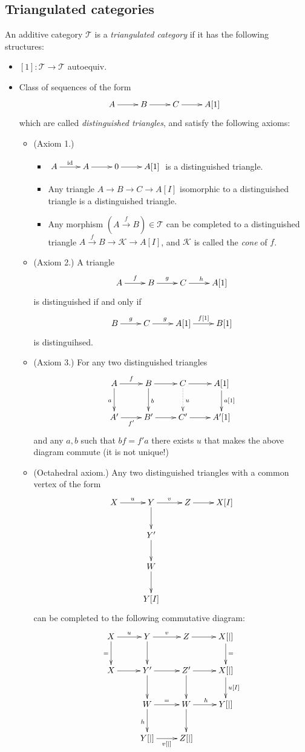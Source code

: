 \subsection*{Triangulated categories}
\label{subsection-triangulated-categories}

\begin{definition}
\label{definition-triangulated-category}
An additive category $\mathcal{T}$ is a {\it triangulated category} if it has
the following structures:
\begin{itemize}
\item $[1]:\mathcal{T} \to \mathcal{T}$ autoequiv.
\item Class of sequences of the form
$$
\xymatrix{
A\ar[r]&B\ar[r]&C\ar[r]&A[1]
}
$$
which are called {\it distinguished triangles}, and satisfy the following
axioms:
\begin{itemize}
\item (Axiom 1.)
\begin{itemize}
\item $\xymatrix{
A\ar[r]^{\text{id}}&A \ar[r]& 0\ar[r]&A[1]
}$ is a distinguished triangle.
\item Any triangle $A \to B \to C \to A[I]$ isomorphic to a distinguished
triangle is a distinguished triangle.
\item Any morphism $(A \xrightarrow{f}B)\in \mathcal{T}$ can be completed to a
distinguished triangle $A\xrightarrow{f}B \to \mathcal{K} \to A[I]$, and
$\mathcal{K}$ is called the {\it cone} of $f$.
\end{itemize}
\item (Axiom 2.) A triangle
$$
\xymatrix{
A\ar[r]^f &  B \ar[r]^g &  C\ar[r]^h & A[1]
}
$$
is distinguished if and only if
$$
\xymatrix{
B\ar[r]^g &  C \ar[r]^g &  A[1]\ar[r]^{f[1]} & B[1]
}
$$
is distinguihsed.

\item (Axiom 3.) For any two distinguished triangles
$$
\xymatrix{
A\ar[r]^f\ar[d]_a &  B \ar[r]\ar[d]^b &  C \ar@{.>}[d]^{u}\ar[r]& 
A[1]\ar[d]^{a[1]}\\
A'\ar[r]_{f'}& B'\ar[r]& C'\ar[r]&A'[1]
}
$$
and any $a,b$ such that $bf=f'a$ there exists $u$ that makes the above diagram
commute (it is not unique!)

\item (Octahedral axiom.) Any two distinguished triangles with a common vertex 
of the form 
$$
\xymatrix{
X\ar[r]^u& Y\ar[r]^v\ar[d]& Z\ar[r]&X[I]\\
& Y'\ar[d]\\
& W\ar[d]\\
& Y[I]
}
$$
can be
completed to the following commutative diagram:
$$
\xymatrix{
X\ar[d]_{=}\ar[r]^u& Y\ar[r]^v\ar[d]&  Z\ar[r]&  X[|]\ar[d]^=\\
X\ar[r]&  Y'\ar[d]\ar[r]&  Z'\ar[d]\ar[r]& X[|]\ar[d]^{u[I]}\\
& W\ar[r]^=\ar[d]_h & W\ar[r]^h\ar[d]&  Y[|]\\
& Y[|]\ar[r]_{v[|]}&Z[|]
}
$$
\end{itemize}
\end{itemize}
\end{definition}

